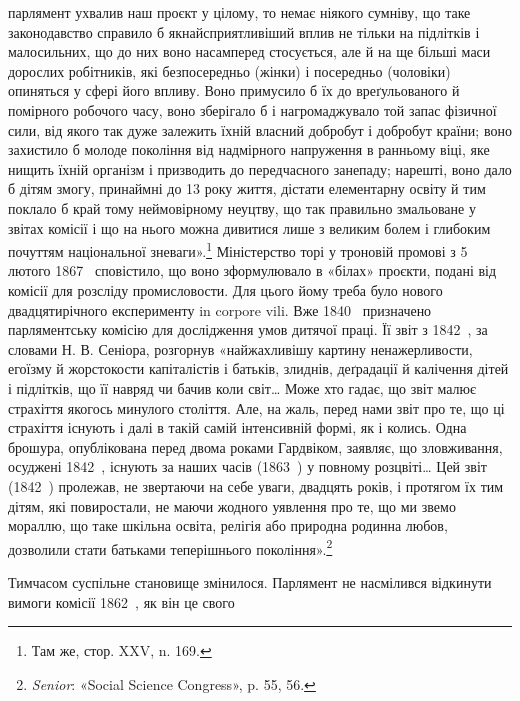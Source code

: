 \parcont{}  %
парлямент ухвалив наш проєкт у цілому, то немає ніякого сумніву,
що таке законодавство справило б якнайсприятливіший
вплив не тільки на підлітків і малосильних, що до них воно
насамперед стосується, але й на ще більші маси дорослих робітників,
які безпосередньо (жінки) і посередньо (чоловіки) опиняться
у сфері його впливу. Воно примусило б їх до вреґульованого
й помірного робочого часу, воно зберігало б і нагромаджувало
той запас фізичної сили, від якого так дуже залежить їхній
власний добробут і добробут країни; воно захистило б молоде
покоління від надмірного напруження в ранньому віці, яке
нищить їхній організм і призводить до передчасного занепаду;
нарешті, воно дало б дітям змогу, принаймні до 13 року життя,
дістати елементарну освіту й тим поклало б край тому неймовірному
неуцтву, що так правильно змальоване у звітах комісії
і що на нього можна дивитися лише з великим болем і глибоким
почуттям національної зневаги».\footnote{
Там же, стор. XXV, n. 169.
} Міністерство торі у троновій
промові з 5 лютого 1867~ сповістило, що воно зформулювало в
«білах» проєкти, подані від комісії для розсліду промисловости.
Для цього йому треба було нового двадцятирічного
експерименту in corpore vili. Вже 1840~ призначено парляментську
комісію для дослідження умов дитячої праці. Її звіт з 1842~,
за словами Н. В. Сеніора, розгорнув «найжахливішу картину
ненажерливости, егоїзму й жорстокости капіталістів і батьків,
злиднів, деґрадації й калічення дітей і підлітків, що її навряд
чи бачив коли світ\dots{} Може хто гадає, що звіт малює страхіття
якогось минулого століття. Але, на жаль, перед нами звіт про
те, що ці страхіття існують і далі в такій самій інтенсивній формі,
як і колись. Одна брошура, опублікована перед двома роками
Гардвіком, заявляє, що зловживання, осуджені 1842~,
існують за наших часів (1863~) у повному розцвіті\dots{} Цей звіт
(1842~) пролежав, не звертаючи на себе уваги, двадцять років,
і протягом їх тим дітям, які повиростали, не маючи жодного
уявлення про те, що ми звемо мораллю, що таке шкільна освіта,
релігія або природна родинна любов, дозволили стати батьками
теперішнього покоління».\footnote{
\emph{Senior}: «Social Science Congress», p. 55, 56.
}

Тимчасом суспільне становище змінилося. Парлямент не
насмілився відкинути вимоги комісії 1862~, як він це свого
\parbreak{}  %
